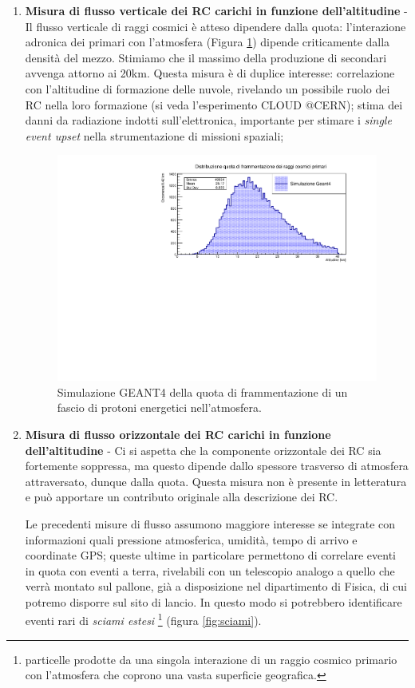 \begin{enumerate}
    \item \textbf{Misura di flusso verticale dei RC carichi in funzione dell'altitudine} - Il flusso verticale di raggi cosmici è atteso dipendere dalla quota: l'interazione adronica dei primari con l'atmosfera (Figura \ref{frammentazione primari}) dipende criticamente dalla densità del mezzo. Stimiamo che il massimo della produzione di secondari avvenga attorno ai 20km. Questa misura è di duplice interesse: correlazione con l'altitudine di formazione delle nuvole, rivelando un possibile ruolo dei RC nella loro formazione (si veda l'esperimento CLOUD @CERN); stima dei danni da radiazione indotti sull'elettronica, importante per stimare i \textit{single event upset} nella strumentazione di missioni spaziali;
    \begin{figure}
        \centering
        \includegraphics[width=0.9\linewidth]{Frammentazione_verticale.pdf}
        \caption{Simulazione GEANT4 della quota di frammentazione di un fascio di protoni energetici nell'atmosfera.}
        \label{frammentazione primari}
    \end{figure}
    
    \item \textbf{Misura di flusso orizzontale dei RC carichi in funzione dell'altitudine} - Ci si aspetta che la componente orizzontale dei RC sia fortemente soppressa, ma questo dipende dallo spessore trasverso di atmosfera attraversato, dunque dalla quota. Questa misura non è presente in letteratura e può apportare un contributo originale alla descrizione dei RC.
    
Le precedenti misure di flusso assumono maggiore interesse se integrate con informazioni quali pressione atmosferica, umidità, tempo di arrivo e coordinate GPS; queste ultime in particolare permettono di correlare eventi in quota con eventi a terra, rivelabili con un telescopio analogo a quello che verrà montato sul pallone, già a disposizione nel dipartimento di Fisica, di cui potremo disporre sul sito di lancio. In questo modo si potrebbero identificare eventi rari di \emph{sciami estesi} \footnote{particelle prodotte da una singola interazione di un raggio cosmico primario con l'atmosfera che coprono una vasta superficie geografica.} (figura \ref{fig:sciami}). 
    

\end{enumerate}
